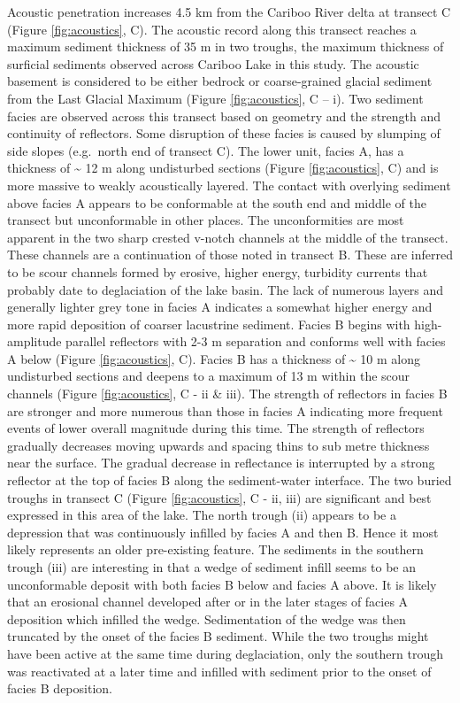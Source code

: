 \documentclass[Royal,times,doublespace,sageh]{sagej}
\begin{document}
Acoustic penetration increases 4.5 km from the Cariboo River delta at
transect C (Figure \ref{fig:acoustics}, C). The acoustic record along
this transect reaches a maximum sediment thickness of 35 m in two
troughs, the maximum thickness of surficial sediments observed across
Cariboo Lake in this study. The acoustic basement is considered to be
either bedrock or coarse-grained glacial sediment from the Last Glacial
Maximum (Figure \ref{fig:acoustics}, C -- i). Two sediment facies are
observed across this transect based on geometry and the strength and
continuity of reflectors. Some disruption of these facies is caused by
slumping of side slopes (e.g.~north end of transect C). The lower unit,
facies A, has a thickness of \textasciitilde{} 12 m along undisturbed
sections (Figure \ref{fig:acoustics}, C) and is more massive to weakly
acoustically layered. The contact with overlying sediment above facies A
appears to be conformable at the south end and middle of the transect
but unconformable in other places. The unconformities are most apparent
in the two sharp crested v-notch channels at the middle of the transect.
These channels are a continuation of those noted in transect B. These
are inferred to be scour channels formed by erosive, higher energy,
turbidity currents that probably date to deglaciation of the lake basin.
The lack of numerous layers and generally lighter grey tone in facies A
indicates a somewhat higher energy and more rapid deposition of coarser
lacustrine sediment. Facies B begins with high-amplitude parallel
reflectors with 2-3 m separation and conforms well with facies A below
(Figure \ref{fig:acoustics}, C). Facies B has a thickness of
\textasciitilde{} 10 m along undisturbed sections and deepens to a
maximum of 13 m within the scour channels (Figure \ref{fig:acoustics}, C
- ii \& iii). The strength of reflectors in facies B are stronger and
more numerous than those in facies A indicating more frequent events of
lower overall magnitude during this time. The strength of reflectors
gradually decreases moving upwards and spacing thins to sub metre
thickness near the surface. The gradual decrease in reflectance is
interrupted by a strong reflector at the top of facies B along the
sediment-water interface. The two buried troughs in transect C (Figure
\ref{fig:acoustics}, C - ii, iii) are significant and best expressed in
this area of the lake. The north trough (ii) appears to be a depression
that was continuously infilled by facies A and then B. Hence it most
likely represents an older pre-existing feature. The sediments in the
southern trough (iii) are interesting in that a wedge of sediment infill
seems to be an unconformable deposit with both facies B below and facies
A above. It is likely that an erosional channel developed after or in
the later stages of facies A deposition which infilled the wedge.
Sedimentation of the wedge was then truncated by the onset of the facies
B sediment. While the two troughs might have been active at the same
time during deglaciation, only the southern trough was reactivated at a
later time and infilled with sediment prior to the onset of facies B
deposition.
\end{document}

